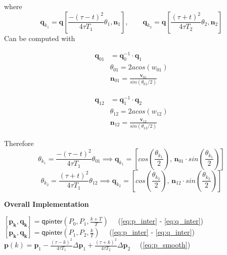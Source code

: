 \documentclass[10pt, aspectratio=169]{beamer}
\theoremstyle{remark}
\theoremstyle{definition}
\begin{document}
\begin{frame}[allowframebreaks]
where 
\begin{equation}
\mathbf{q}_{k_1} = \mathbf{q} \left[\frac{-(\tau - t)^2}{4\tau T_1} \theta_1, \mathbf{n}_1 \right], \quad \quad \mathbf{q}_{k_2} = \mathbf{q} \left[ \frac{(\tau + t)^2}{4\tau T_2} \theta_2, \mathbf{n}_2 \right]
\end{equation}
Can be computed with\\
\begin{minipage}{.45\linewidth}
    \begin{equation}
    \begin{split}
        \mathbf{q}_{01} &= \mathbf{q}_0^{-1} \cdot \mathbf{q}_1\\
        & \theta_{01} = 2 acos(w_{01})\\
        & \mathbf{n}_{01} = \frac{\mathbf{v}_{01}}{sin(\theta_{01}/2 )}
    \end{split}
    \end{equation}
\end{minipage}%
\begin{minipage}{.45\linewidth}
    \begin{equation}
    \begin{split}
        \mathbf{q}_{12} &= \mathbf{q}_1^{-1} \cdot \mathbf{q}_2\\
        & \theta_{12} = 2 acos(w_{12})\\
        & \mathbf{n}_{12} = \frac{\mathbf{v}_{12}}{sin(\theta_{12}/2 )}
    \end{split}
    \end{equation}
\end{minipage}

Therefore
\begin{equation}
    \theta_{k_1} = \frac{-(\tau - t)^2}{4\tau T_1} \theta_{01} \implies \mathbf{q}_{k_1} = \left[cos\left( \frac{\theta_{k_1} }{2}  \right), \, \mathbf{n}_{01} \cdot sin \left(\frac{\theta_{k_1} }{2} \right)\right]
\end{equation}
\begin{equation}
    \theta_{k_2} = \frac{(\tau + t)^2}{4\tau T_1} \theta_{12} \implies \mathbf{q}_{k_2} = \left[cos\left( \frac{\theta_{k_2} }{2}  \right), \, \mathbf{n}_{12} \cdot sin \left(\frac{\theta_{k_2} }{2} \right)\right]
    \label{eq:theta_k2}
\end{equation}


\framebreak
\textcolor{uma_blue_dark}{\textbf{Overall Implementation}}

\begin{algorithm}[H]
 	{   
       {
            $[\mathbf{p_k}, \mathbf{q_k}] = \textsf{qpinter}(P_0, P_1, \frac{k+T}{T}) \quad$ (\ref{eq:p_inter} - \ref{eq:q_inter})
       }
       {
            $[\mathbf{p_k}, \mathbf{q_k}] = \textsf{qpinter}(P_1, P_2, \frac{k}{T}) \quad$ (\ref{eq:p_inter} - \ref{eq:q_inter})
       }
       \Else
       {
            $\mathbf{p}(k) = \mathbf{p}_1 - \frac{(\tau - k)^2}{4\tau T_1} \Delta \mathbf{p}_1 + \frac{(\tau + k)^2}{4\tau T_2} \Delta \mathbf{p}_2 \quad$ (\ref{eq:p_smooth})\\
            
}}
\end{algorithm}
\end{frame}
\end{document}
